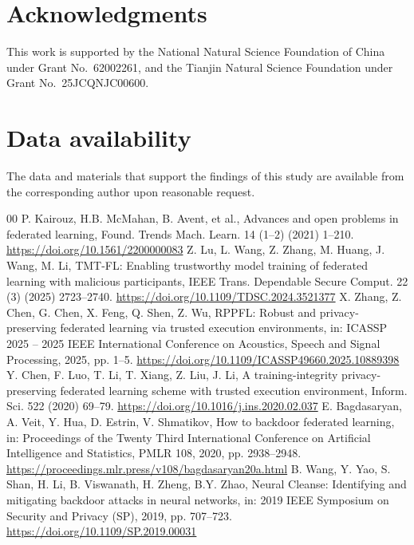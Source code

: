 \documentclass[final,5p,times,twocolumn]{elsarticle/elsarticle}
\begin{document}
\section*{Acknowledgments}
This work is supported by the National Natural Science Foundation of China under Grant No.~62002261, and the Tianjin Natural Science Foundation under Grant No.~25JCQNJC00600.

\section*{Data availability}
The data and materials that support the findings of this study are available from the corresponding author upon reasonable request.

\begingroup
\renewcommand{\bibfont}{\small}
\begin{thebibliography}{00}
    \setlength{\itemsep}{4pt}\setlength{\parskip}{0pt}
     P. Kairouz, H.B. McMahan, B. Avent, et al., Advances and open problems in federated learning, Found. Trends Mach. Learn. 14 (1--2) (2021) 1--210. \url{https://doi.org/10.1561/2200000083}
     Z. Lu, L. Wang, Z. Zhang, M. Huang, J. Wang, M. Li, TMT-FL: Enabling trustworthy model training of federated learning with malicious participants, IEEE Trans. Dependable Secure Comput. 22 (3) (2025) 2723--2740. \url{https://doi.org/10.1109/TDSC.2024.3521377}
     X. Zhang, Z. Chen, G. Chen, X. Feng, Q. Shen, Z. Wu, RPPFL: Robust and privacy-preserving federated learning via trusted execution environments, in: ICASSP 2025 -- 2025 IEEE International Conference on Acoustics, Speech and Signal Processing, 2025, pp. 1--5. \url{https://doi.org/10.1109/ICASSP49660.2025.10889398}
     Y. Chen, F. Luo, T. Li, T. Xiang, Z. Liu, J. Li, A training-integrity privacy-preserving federated learning scheme with trusted execution environment, Inform. Sci. 522 (2020) 69--79. \url{https://doi.org/10.1016/j.ins.2020.02.037}
     E. Bagdasaryan, A. Veit, Y. Hua, D. Estrin, V. Shmatikov, How to backdoor federated learning, in: Proceedings of the Twenty Third International Conference on Artificial Intelligence and Statistics, PMLR 108, 2020, pp. 2938--2948. \url{https://proceedings.mlr.press/v108/bagdasaryan20a.html}
     B. Wang, Y. Yao, S. Shan, H. Li, B. Viswanath, H. Zheng, B.Y. Zhao, Neural Cleanse: Identifying and mitigating backdoor attacks in neural networks, in: 2019 IEEE Symposium on Security and Privacy (SP), 2019, pp. 707--723. \url{https://doi.org/10.1109/SP.2019.00031}

\end{thebibliography}
\end{document}
